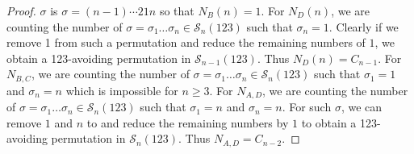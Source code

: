 \documentclass[
final,nomarks
]{dmtcs-episciences}
\newcommand{\Sn}[1]{\mathcal{S}_{#1}}
\begin{document}
\begin{proof}
	\begin{math}\sigma\end{math} is \begin{math}\sigma=(n-1)\cdots 21n\end{math} so that \begin{math}N_{B}(n)=1\end{math}. For \begin{math}N_{D}(n)\end{math}, we are counting the number of \begin{math}\sigma = \sigma_1 \ldots \sigma_n \in \Sn{n}(123)\end{math} such that \begin{math}\sigma_n =1\end{math}. Clearly if we remove 1 from such a permutation and reduce the remaining numbers of \begin{math}1\end{math}, we obtain a 123-avoiding permutation in \begin{math}\Sn{n-1}(123)\end{math}. Thus \begin{math}N_{D}(n)=C_{n-1}\end{math}. For \begin{math}N_{B,C}\end{math}, we are counting the number of \begin{math}\sigma = \sigma_1 \ldots \sigma_n \in \Sn{n}(123)\end{math} such that \begin{math}\sigma_1 =1\end{math} and \begin{math}\sigma_n =n\end{math} which is impossible for \begin{math}n \geq 3\end{math}.  For \begin{math}N_{A,D}\end{math}, we are counting the number of \begin{math}\sigma = \sigma_1 \ldots \sigma_n \in \Sn{n}(123)\end{math} such that \begin{math}\sigma_1 =n\end{math} and \begin{math}\sigma_n =n\end{math}. For such 
	\begin{math}\sigma\end{math}, we can remove \begin{math}1\end{math} and \begin{math}n\end{math} to and reduce the remaining numbers by \begin{math}1\end{math} to obtain 
	a 123-avoiding permutation in \begin{math}\Sn{n}(123)\end{math}. Thus \begin{math}N_{A,D}= C_{n-2}\end{math}. 
	

\end{proof}
\end{document}
